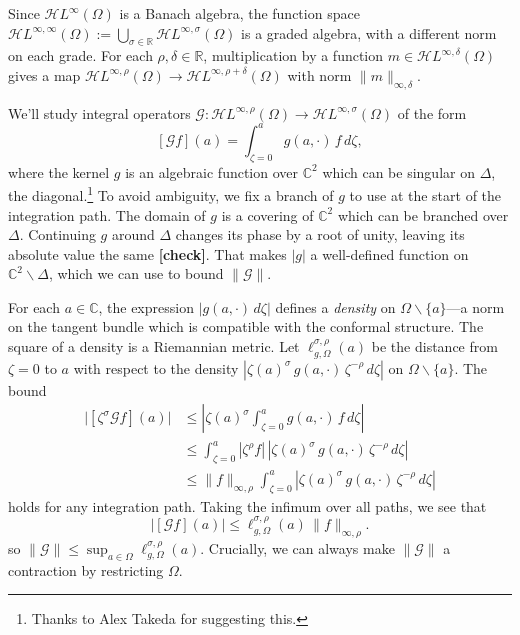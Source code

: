 \documentclass{article}
\theoremstyle{plain}
\newcommand{\maps}{\colon}
\newcommand{\R}{\mathbb{R}}
\newcommand{\C}{\mathbb{C}}
\newcommand{\holoL}[1]{\mathcal{H}L^{#1}} %
\begin{document}
Since $\holoL{\infty}(\Omega)$ is a Banach algebra, the function space $\holoL{\infty, \infty}(\Omega) := \bigcup_{\sigma \in \R} \holoL{\infty, \sigma}(\Omega)$ is a graded algebra, with a different norm on each grade. For each $\rho, \delta \in \R$, multiplication by a function $m \in \holoL{\infty, \delta}(\Omega)$ gives a map $\holoL{\infty, \rho}(\Omega) \to \holoL{\infty, \rho+\delta}(\Omega)$ with norm $\|m\|_{\infty, \delta}$.

We'll study integral operators $\mathcal{G} \maps \holoL{\infty, \rho}(\Omega) \to \holoL{\infty, \sigma}(\Omega)$ of the form
\[ [\mathcal{G}f](a) = \int_{\zeta = 0}^{a} g(a, \cdot)\,f\,d\zeta, \]
where the kernel $g$ is an algebraic function over $\C^2$ which can be singular on $\Delta$, the diagonal.\footnote{Thanks to Alex Takeda for suggesting this.} To avoid ambiguity, we fix a branch of $g$ to use at the start of the integration path. The domain of $g$ is a covering of $\C^2$ which can be branched over $\Delta$. Continuing $g$ around $\Delta$ changes its phase by a root of unity, leaving its absolute value the same \textbf{[check]}. That makes $|g|$ a well-defined function on $\C^2 \smallsetminus \Delta$, which we can use to bound $\|\mathcal{G}\|$.

For each $a \in \C$, the expression $|g(a, \cdot)\,d\zeta|$ defines a {\em density} on $\Omega \smallsetminus \{a\}$---a norm on the tangent bundle which is compatible with the conformal structure. The square of a density is a Riemannian metric. Let $\ell^{\sigma, \rho}_{g, \Omega}(a)$ be the distance from $\zeta = 0$ to $a$ with respect to the density $|\zeta(a)^\sigma\,g(a, \cdot)\,\zeta^{-\rho}\,d\zeta|$ on $\Omega \smallsetminus \{a\}$. The bound
\begin{align*}
\big|[\zeta^\sigma \mathcal{G}f](a)\big| & \le \left| \zeta(a)^\sigma \int_{\zeta = 0}^{a} g(a, \cdot)\,f\,d\zeta \right| \\
& \le \int_{\zeta = 0}^{a} |\zeta^\rho f|\,|\zeta(a)^\sigma\,g(a, \cdot)\,\zeta^{-\rho}\,d\zeta| \\
& \le \|f\|_{\infty, \rho} \int_{\zeta = 0}^{a} |\zeta(a)^\sigma\,g(a, \cdot)\,\zeta^{-\rho}\,d\zeta|
\end{align*}
holds for any integration path. Taking the infimum over all paths, we see that
\[ \big|[\mathcal{G}f](a)\big| \le \ell^{\sigma, \rho}_{g, \Omega}(a)\,\|f\|_{\infty, \rho}. \]
so $\|\mathcal{G}\| \le \sup_{a \in \Omega} \ell^{\sigma, \rho}_{g, \Omega}(a)$. Crucially, we can always make $\|\mathcal{G}\|$ a contraction by restricting $\Omega$.
\end{document}
